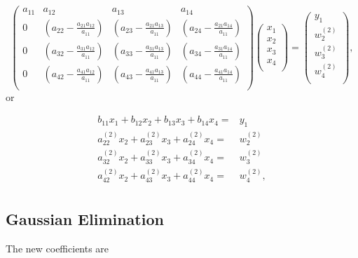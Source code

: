 \documentclass[%
twoside,                 %
final,                   %
10pt]{article}
\begin{document}
{{\[
\left(\begin{array}{cccc}
                           a_{11}& a_{12} &a_{13}& a_{14}\\
                           0& (a_{22}-\frac{a_{21}a_{12}}{a_{11}}) &(a_{23}-\frac{a_{21}a_{13}}{a_{11}}) & (a_{24}-\frac{a_{21}a_{14}}{a_{11}})\\
0& (a_{32}-\frac{a_{31}a_{12}}{a_{11}})& (a_{33}-\frac{a_{31}a_{13}}{a_{11}})& (a_{34}-\frac{a_{31}a_{14}}{a_{11}})\\
0&(a_{42}-\frac{a_{41}a_{12}}{a_{11}}) &(a_{43}-\frac{a_{41}a_{13}}{a_{11}}) & (a_{44}-\frac{a_{41}a_{14}}{a_{11}}) \\
                      \end{array} \right)\left(\begin{array}{c}
                           x_1\\
                           x_2\\
                           x_3 \\
                           x_4  \\
                      \end{array} \right)
  =\left(\begin{array}{c}
                           y_1\\
                           w_2^{(2)}\\
                           w_3^{(2)} \\
                           w_4^{(2)}\\
                      \end{array} \right),
\]
or

\begin{align}
 b_{11}x_1 +b_{12}x_2 +b_{13}x_3 + b_{14}x_4=&y_1 \nonumber \\
 a^{(2)}_{22}x_2 + a^{(2)}_{23}x_3 + a^{(2)}_{24}x_4=&w^{(2)}_2 \nonumber \\
 a^{(2)}_{32}x_2 + a^{(2)}_{33}x_3 + a^{(2)}_{34}x_4=&w^{(2)}_3 \nonumber \\
 a^{(2)}_{42}x_2 + a^{(2)}_{43}x_3 + a^{(2)}_{44}x_4=&w^{(2)}_4, \nonumber \\
\end{align}

\subsection{Gaussian Elimination}

The new coefficients are

}}
\end{document}
